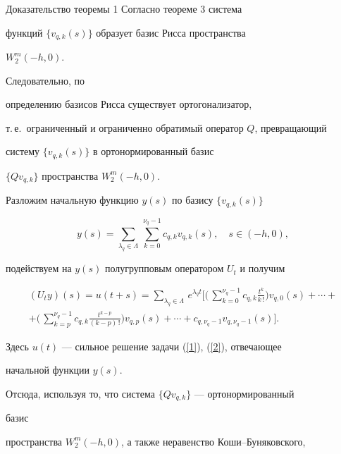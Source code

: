 \begin{pf*}{Доказательство теоремы 1} Согласно теореме 3 система 


функций $\{v_{q,k}(s)\}$ образует базис Рисса пространства 


$W^m_2(-h,0)$. 


Следовательно, по 


определению базисов Рисса существует ортогонализатор, 


т.\,е.~ограниченный и ограниченно обратимый оператор $Q$, превращающий 


систему $\{v_{q,k}(s)\}$ в ортонормированный базис 


$\{Q v_{q,k}\}$ пространства $W^m_2(-h,0)$. 


 


Разложим начальную функцию $y(s)$ по базису $\{v_{q,k}(s)\}$ 


$$ 


y(s)=\sum_{\lambda_q\in\Lambda}\, 


\sum^{\nu_q-1}_{k=0}c_{q,k}v_{q,k}(s),\quad s\in(-h,0), 


$$ 


подействуем на $y(s)$ полугрупповым оператором $U_t$ и получим 


\begin{multline*} 


\label{21} 


(U_t y)(s)=u(t+s)=\sum_{\lambda_q\in\Lambda}\, 


e^{\lambda_q t}\bigg[\bigg(\,\sum^{\nu_q-1}_{k=0} 


c_{q,k}\frac{t^k}{k\,!}\bigg)v_{q,0}(s)+\dotsb+\\ 


+\bigg(\,\sum^{\nu_q-1}_{k=p}c_{q,k} 


\frac{t^{k-p}}{(k-p)\,!}\bigg)v_{q,p}(s)+\dotsb + 


c_{q,\nu_q-1}v_{q,\nu_q-1}(s)\bigg]. 


\end{multline*} 


Здесь $u(t)$ --- сильное решение задачи (\ref{1}), (\ref{2}), отвечающее 


начальной функции $y(s)$. 


 


Отсюда, используя то, что система $\{Q v_{q,k}\}$ --- ортонормированный 


базис 


пространства $W^m_2(-h,0)$, а также неравенство Коши--Буняковского, 



\end{pf*}
